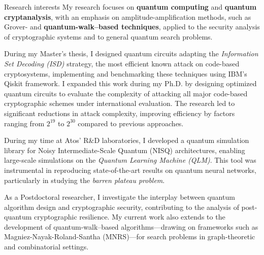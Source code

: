 \documentclass[
	a4paper, %
	10pt, %
]{tresume} %
\begin{document}
\begin{tSection}{Research interests}
  My research focuses on \textbf{quantum computing} and \textbf{quantum
    cryptanalysis}, with an emphasis on amplitude-amplification methods, such as
  Grover- and \textbf{quantum-walk–based techniques}, applied to the security
  analysis of cryptographic systems and to general quantum search problems.

  During my Master's thesis, I designed quantum circuits adapting the
  \emph{Information Set Decoding (ISD)} strategy, the most efficient known
  attack on code-based cryptosystems, implementing and benchmarking these
  techniques using IBM’s Qiskit framework. I expanded this work during my Ph.D.
  by designing optimized quantum circuits to evaluate the complexity of
  attacking all major code-based cryptographic schemes under international
  evaluation. The research led to significant reductions in attack complexity,
  improving efficiency by factors ranging from $2^{19}$ to $2^{30}$ compared to
  previous approaches.

  During my time at Atos' R\&D laboratories, I developed a quantum simulation
  library for Noisy Intermediate-Scale Quantum (NISQ) architectures, enabling
  large-scale simulations on the \emph{Quantum Learning Machine (QLM)}. This
  tool was instrumental in reproducing state-of-the-art results on quantum
  neural networks, particularly in studying the \emph{barren plateau problem}.

  As a Postdoctoral researcher, I investigate the interplay between quantum
  algorithm design and cryptographic security, contributing to the analysis of
  post-quantum cryptographic resilience. My current work also extends to the
  development of quantum-walk–based algorithms—drawing on frameworks such as
  Magniez-Nayak-Roland-Santha (MNRS)—for search problems in graph-theoretic and
  combinatorial settings.


\end{tSection}
\end{document}
